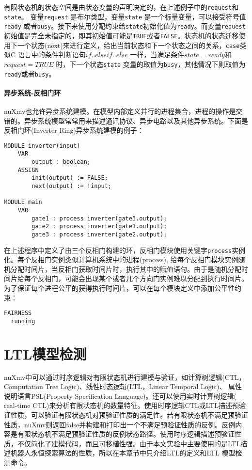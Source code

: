 有限状态机的状态空间是由状态变量的声明决定的，在上述例子中的\verb|request|和\verb|state|。 变量\verb|request| 是布尔类型，变量\verb|state| 是一个标量变量，可以接受符号值\verb|ready| 或者\verb|busy|。接下来使用分配约束给\verb|state|初始化值为\verb|ready|。而变量\verb|request| 初始值是完全未指定的，即其初始值可能是\verb|TRUE|或者\verb|FALSE|。状态机的状态迁移使用下一个状态(next)来进行定义，给出当前状态和下一个状态之间的关系，\verb|case|类似C 语言中的条件判断语句$if..else if..else $ 一样，当满足条件$state = ready$和$request = TRUE$ 时，下一个状态\verb|state| 变量的取值为\verb|busy|，其他情况下则取值为\verb|ready|或者\verb|busy|。

\paragraph{异步系统-反相门环}
nuXmv也允许异步系统建模。在模型内部定义并行的进程集合，进程的操作是交错的。异步系统模型常常用来描述通讯协议、异步电路以及其他异步系统。下面是反相门环(Inverter Ring)异步系统建模的例子：

\begin{lstlisting}
MODULE inverter(input)
    VAR
        output : boolean;
    ASSIGN
        init(output) := FALSE;
        next(output) := !input;

MODULE main
    VAR
        gate1 : process inverter(gate3.output);
        gate2 : process inverter(gate1.output);
        gate3 : process inverter(gate2.output);
\end{lstlisting}

在上述程序中定义了由三个反相门构建的环，反相门模块使用关键字\verb|process|实例化。每个反相门实例类似计算机系统中的进程(process), 给每个反相门模块实例随机分配时间片，当反相门获取时间片时，执行其中的赋值语句。由于是随机分配时间片给每个反相门，可能会出现某个或者几个方向门实例难以分配到执行时间片。为了保证每个进程公平的获得执行时间片，可以在每个模块定义中添加公平性约束：

\begin{lstlisting}
FAIRNESS
  running
\end{lstlisting}

\section{LTL模型检测}
nuXmv中可以通过时序逻辑对有限状态机进行建模与验证，如计算树逻辑(CTL，Computation Tree Logic)、线性时态逻辑(LTL，Linear Temporal Logic)、 属性说明语言PSL(Property Specification Language)。还可以使用实时计算树逻辑( real-time CTL)来分析有限状态机的数量特征。使用时序逻辑CTL或LTL描述预验证性质，可以验证有限状态机对预验证性质的满足性。若有限状态机不满足预验证性质，nuXmv则返回false并构建和打印出一个不满足预验证性质的反例。反例内容是有限状态机不满足预验证性质的反例状态路径。使用时序逻辑描述预验证性质，不仅简化了建模代码，而且可移植性强。由于本文实验中主要使用的是LTL描述机器人永恒探索算法的性质，所以在本章节中只介绍LTL的定义和LTL 模型检测命令。

